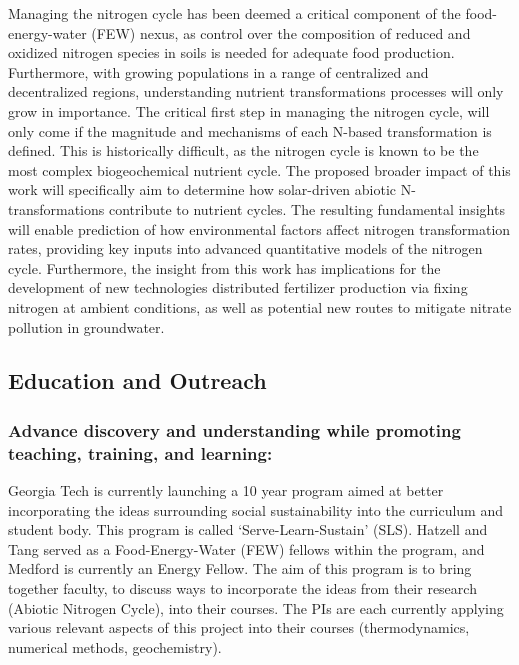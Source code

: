 Managing the nitrogen cycle has been deemed a critical component of the food-energy-water (FEW) nexus, as control over the composition of reduced and oxidized nitrogen species in soils is needed for adequate food production. Furthermore, with growing populations in a range of centralized and decentralized regions, understanding nutrient transformations processes will only grow in importance. The critical first step in managing the nitrogen cycle, will only come if the magnitude and mechanisms of each N-based transformation is defined. This is historically difficult, as the  nitrogen cycle is known to be the most complex biogeochemical nutrient cycle.  The proposed broader impact of this work will specifically aim to determine how solar-driven abiotic N-transformations contribute to nutrient cycles. The resulting fundamental insights will enable prediction of how environmental factors affect nitrogen transformation rates, providing key inputs into advanced quantitative models of the nitrogen cycle. Furthermore, the insight from this work has implications for the development of new technologies distributed fertilizer production via fixing nitrogen at ambient conditions, as well as potential new routes to mitigate nitrate pollution in groundwater.

\vspace{2mm}

\subsection{Education and Outreach}
\vspace{2mm}

\subsubsection*{Advance discovery and understanding while promoting teaching, training, and learning:} Georgia Tech is currently launching a 10 year program aimed at better incorporating the ideas surrounding social sustainability into the curriculum and student body. This program is called ‘Serve-Learn-Sustain’ (SLS). Hatzell and Tang served as a Food-Energy-Water (FEW) fellows within the program, and Medford is currently an Energy Fellow. The aim of this program is to bring together faculty, to discuss ways to incorporate the ideas from their research (Abiotic Nitrogen Cycle), into their courses. The PIs are each currently applying various relevant aspects of this project into their courses (thermodynamics, numerical methods, geochemistry). 

